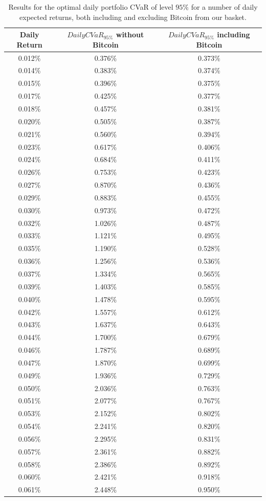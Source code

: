 \begin{table}
	\centering
	\caption[CVaR efficient frontier on returns]{Results for the optimal daily portfolio CVaR of level $95\%$ for a number of daily expected returns, both including and excluding Bitcoin from our basket.}
	\label{tab:return_cvar}
\begin{tabular}{ccc}
	
	Daily Return & $DailyCVaR_{95\%}$ without Bitcoin & $DailyCVaR_{95\%}$ including Bitcoin \\
	\midrule
	0.012\% & 0.376\% & 0.373\% \\
	0.014\% & 0.383\% & 0.374\% \\
	0.015\% & 0.396\% & 0.375\% \\
	0.017\% & 0.425\% & 0.377\% \\
	0.018\% & 0.457\% & 0.381\% \\
	0.020\% & 0.505\% & 0.387\% \\
	0.021\% & 0.560\% & 0.394\% \\
	0.023\% & 0.617\% & 0.406\% \\
	0.024\% & 0.684\% & 0.411\% \\
	0.026\% & 0.753\% & 0.423\% \\
	0.027\% & 0.870\% & 0.436\% \\
	0.029\% & 0.883\% & 0.455\% \\
	0.030\% & 0.973\% & 0.472\% \\
	0.032\% & 1.026\% & 0.487\% \\
	0.033\% & 1.121\% & 0.495\% \\
	0.035\% & 1.190\% & 0.528\% \\
	0.036\% & 1.256\% & 0.536\% \\
	0.037\% & 1.334\% & 0.565\% \\
	0.039\% & 1.403\% & 0.585\% \\
	0.040\% & 1.478\% & 0.595\% \\
	0.042\% & 1.557\% & 0.612\% \\
	0.043\% & 1.637\% & 0.643\% \\
	0.044\% & 1.700\% & 0.679\% \\
	0.046\% & 1.787\% & 0.689\% \\
	0.047\% & 1.870\% & 0.699\% \\
	0.049\% & 1.936\% & 0.729\% \\
	0.050\% & 2.036\% & 0.763\% \\
	0.051\% & 2.077\% & 0.767\% \\
	0.053\% & 2.152\% & 0.802\% \\
	0.054\% & 2.241\% & 0.820\% \\
	0.056\% & 2.295\% & 0.831\% \\
	0.057\% & 2.361\% & 0.882\% \\
	0.058\% & 2.386\% & 0.892\% \\
	0.060\% & 2.421\% & 0.918\% \\
	0.061\% & 2.448\% & 0.950\% \\
	\midrule
\end{tabular}

\end{table}

